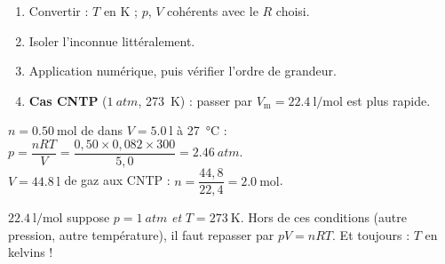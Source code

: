 \documentclass[11pt,a4paper]{article}
\begin{document}
\begin{methode}[Résoudre un problème avec $pV=nRT$]
\begin{enumerate}[leftmargin=1.6em,topsep=2pt,itemsep=1pt]
  \item Convertir : $T$ en \si{\kelvin} ; $p$, $V$ cohérents avec le $R$ choisi.
  \item Isoler l'inconnue littéralement.
  \item Application numérique, puis vérifier l'ordre de grandeur.
  \item \textbf{Cas CNTP} ($\qty{1}{atm}$, \qty{273}{\kelvin}) : passer par $V_{\mathrm{m}}=\qty{22.4}{\litre\per\mole}$
        est plus rapide.
\end{enumerate}
\end{methode}

\begin{exemplebox}
$n=\qty{0.50}{\mole}$ de  dans $V=\qty{5.0}{\litre}$ à \qty{27}{\degreeCelsius} :
$p=\dfrac{nRT}{V}=\dfrac{0{,}50\times0{,}082\times300}{5{,}0}=\qty{2.46}{atm}$. \\[2pt]
$V=\qty{44.8}{\litre}$ de gaz aux CNTP : $n=\dfrac{44{,}8}{22{,}4}=\qty{2.0}{\mole}$.
\end{exemplebox}

\begin{piege}
$\qty{22.4}{\litre\per\mole}$ suppose $p=\qty{1}{atm}$ \emph{et} $T=\qty{273}{\kelvin}$. Hors de ces
conditions (autre pression, autre température), il faut repasser par $pV=nRT$. Et toujours : $T$ en
kelvins !
\end{piege}
\end{document}
